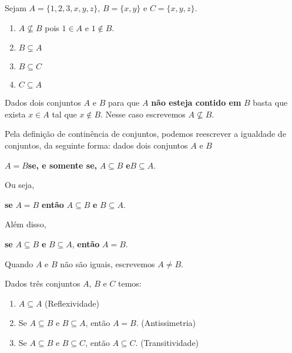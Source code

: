 \documentclass{beamer}
\begin{document}
    \begin{frame}
        \begin{exemplos}
            Sejam $A = \{1,2,3,x,y,z\}$, \pause $B = \{x, y\}$ \pause e $C = \{x, y , z\}$.\pause
            \begin{enumerate}[label={\arabic*})]
                \item $A \nsubseteq B$ \pause pois $1 \in A$ e $1 \notin B$.\pause
                \item $B \subsetneq A$\pause
                \item $B \subseteq C$\pause
                \item $C \subseteq A$\pause
            \end{enumerate}
        \end{exemplos}

        \begin{observacao}
            Dados dois conjuntos $A$ e $B$ \pause para que $A$ \textbf{n\~ao esteja contido em} $B$ basta \pause que exista $x \in A$ tal que $x \notin B$. \pause Nesse caso escrevemos $A \nsubseteq B$.
        \end{observacao}
    \end{frame}
    \begin{frame}
        \vspace{.4cm}
        Pela defini\c{c}\~ao de contin\^encia de conjuntos, podemos reescrever a igualdade de conjuntos, da seguinte forma: \pause dados dois conjuntos $A$ e $B$\pause
        \begin{center}
            $A = B$\quad \textbf{se, e somente se,} \pause\quad $A \subseteq B$ \quad\pause \textbf{e}\quad $B \subseteq A$.\pause
        \end{center}

        Ou seja,
        \begin{center}
            \textbf{se} $A = B$ \textbf{ent{\~a}o} $A \subseteq B$ \textbf{e} $B \subseteq A$.\pause
        \end{center}

        Al\'em disso,
        \begin{center}
            \textbf{se} $A \subseteq B$ \textbf{e} $B \subseteq A$, \textbf{ent{\~a}o} $A = B$.\pause
        \end{center}

        Quando $A$ e $B$ n{\~a}o s{\~a}o iguais, escrevemos $A \neq B$.\pause

        \begin{proposicao}
            Dados tr\^es conjuntos $A$, $B$ e $C$ temos:\pause
            \begin{enumerate}[label={\roman*})]
                \item $A\subseteq A$ (Reflexividade)\pause
                \item Se $A\subseteq B \mbox{ e } B\subseteq A$, ent{\~a}o $A=B$. (Antissimetria)\pause
                \item Se $A\subseteq B$ e $B\subseteq C$, ent{\~a}o $A\subseteq C$. (Transitividade)\pause
            \end{enumerate}
        \end{proposicao}
    \end{frame}
\end{document}
